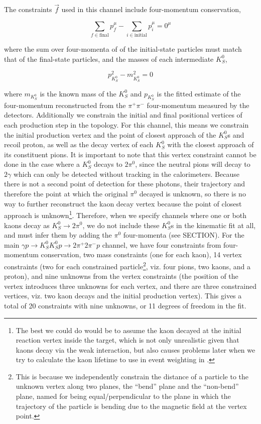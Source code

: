 The constraints $\vec{f}$ used in this channel include four-momentum conservation,

\begin{equation}
  \sum_{f\in\text{final}} p^\mu_{f} - \sum_{i\in\text{initial}} p^\mu_{i} = 0^\mu
  \label{eq:four-momentum-constraint}
\end{equation}

where the sum over four-momenta of of the initial-state particles must match that of the final-state particles, and the masses of each intermediate $K_S^0$,

\begin{equation}
  p_{K_S^0}^2 - m_{K_S^0}^2 = 0
\end{equation}

where $m_{K_S^0}$ is the known mass of the $K_S^0$ and $p_{K_S^0}$ is the fitted estimate of the four-momentum reconstructed from the $\pi^+\pi^-$ four-momentum measured by the detectors. Additionally we constrain the initial and final positional vertices of each production step in the topology. For this channel, this means we constrain the initial production vertex and the point of closest approach of the $K_S^0$s and recoil proton, as well as the decay vertex of each $K_S^0$ with the closest approach of its constituent pions. It is important to note that this vertex constraint cannot be done in the case where a $K_S^0$ decays to $2\pi^0$, since the neutral pions will decay to $2\gamma$ which can only be detected without tracking in the calorimeters. Because there is not a second point of detection for these photons, their trajectory and therefore the point at which the original $\pi^0$ decayed is unknown, so there is no way to further reconstruct the kaon decay vertex because the point of closest approach is unknown\footnote{The best we could do would be to assume the kaon decayed at the initial reaction vertex inside the target, which is not only unrealistic given that kaons decay via the weak interaction, but also causes problems later when we try to calculate the kaon lifetime to use in event weighting in .}. Therefore, when we specify channels where one or both kaons decay as $K_S^0\to 2\pi^0$, we do not include these $K_S^0$s in the kinematic fit at all, and must infer them by adding the $\pi^0$ four-momenta (see {\color{red} SECTION}). For the main $\gamma p \to K_S^0K_S^0p \to 2\pi^+2\pi^-p$ channel, we have four constraints from four-momentum conservation, two mass constraints (one for each kaon), 14 vertex constraints (two for each constrained particle\footnote{This is because we independently constrain the distance of a particle to the unknown vertex along two planes, the ``bend'' plane and the ``non-bend'' plane, named for being equal/perpendicular to the plane in which the trajectory of the particle is bending due to the magnetic field at the vertex point.}, viz. four pions, two kaons, and a proton), and nine unknowns from the vertex constraints (the position of the vertex introduces three unknowns for each vertex, and there are three constrained vertices, viz. two kaon decays and the initial production vertex). This gives a total of 20 constraints with nine unknowns, or 11 degrees of freedom in the fit.

